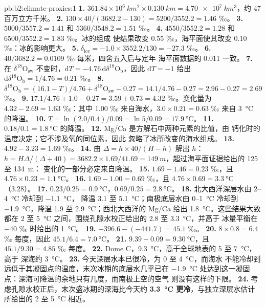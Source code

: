 \begin{solution}{pb:b2:climate-proxies:1}
\textbf{1.} $361.84 \times 10^6\ \unit{km^2} \times \qty{0.130}{km} = \qty{4.70e7}{km^3}$，约 47
百万立方千米。
\textbf{2.} $130 \times 40/(3682.2 - 130) = 5200/3552.2 = 1.46$ ‰。
\textbf{3.} $5000/3557.2 = 1.41$ 和 $5360/3548.2 = 1.51$ ‰。
\textbf{4.} $4550/3552.2 = 1.28$ 和 $6500/3552.2 = 1.83$ ‰。冰的组成
使结果改变 \num{0.55} ‰，海平面使其改变 \num{0.10} ‰：冰的影响更大。
\textbf{5.} $\delta_{\mathrm{ice}} = -1.0 \times 3552.2/130 = -27.3$ ‰。
\textbf{6.} $40/3682.2 = 0.0109$ ‰ 每米，四舍五入后与定年
海平面数据的 \num{0.011} 一致。
\textbf{7.} 在 $\delta^{18}\mathrm{O}_{\mathrm{sw}}$ 不变时，$\mathrm{d}T = -4.76\,\mathrm{d}\delta^{18}
\mathrm{O}_{\mathrm{b}}$，因此 $\mathrm{d}T = -1$ 给出 $\mathrm{d}\delta^{18}\mathrm{O}_{\mathrm{b}} =
1/4.76 = 0.21$ ‰。
\textbf{8.} $\delta^{18}\mathrm{O}_{\mathrm{b}} = (16.1 - T)/4.76 + \delta^{18}\mathrm{O}_{\mathrm{sw}}
- 0.27 = 14.1/4.76 - 0.27 = 2.96 - 0.27 = 2.69$ ‰。
\textbf{9.} $17.1/4.76 + 1.0 - 0.27 = 3.59 + 0.73 = 4.32$ ‰。变化量为 $4.32 - 2.69 =
1.63$ ‰：其中 \num{1.00} ‰ 来自海水，$3.0 \times 0.21 = 0.63$ ‰ 来自
\qty{3}{\celsius} 的降温。
\textbf{10.} $T = \ln(2.0/0.4)/0.09 = \ln 5/0.09 = \qty{17.9}{\celsius}$。
\textbf{11.} $0.18/0.1 = \qty{1.8}{\celsius}$ 的降温。
\textbf{12.} Mg/Ca 是方解石中两种元素的比值，由
钙化时的温度决定；它不涉及氧的同位素，因此
忽略了冰所改变的海水组成。
\textbf{13.} $4.92 - 3.23 = 1.69$ ‰。
\textbf{14.} 由 $\Delta = h \times 40/(H - h)$ 解出 $h$：$h = H\Delta/(\Delta + 40) = 3682.2
\times 1.69/41.69 = \qty{149}{m}$，超过海平面证据给出的 125 至 \qty{134}{m}：
变化的一部分必定来自降温。
\textbf{15.} $1.69 - 1.46 = 0.23$ ‰，且 $4.76 \times 0.23 = \qty{1.1}{\celsius}$。
\textbf{16.} $1.69 - 1.00 = 0.69$ ‰，且 $4.76 \times 0.69 = \qty{3.3}{\celsius}$（3.28）。
\textbf{17.} $0.23/0.25 = \qty{0.9}{\celsius}$，$0.69/0.25 = \qty{2.8}{\celsius}$。
\textbf{18.} 北大西洋深层水由 2--\qty{4}{\celsius} 冷却到 \qty{-1.1}{\celsius}，
降温 3.1 至 \qty{5.1}{\celsius}；南极底层水由 0--\qty{1}{\celsius} 冷却到
\qty{-1.9}{\celsius}，降温 1.9 至 \qty{2.9}{\celsius}；西北大西洋的 Mg/Ca 给出
\qty{1.8}{\celsius}。这些结果大致都在 2 至 \qty{5}{\celsius} 之间，围绕孔隙水校正给出的 2.8 至
\qty{3.3}{\celsius}，并高于
冰量平衡在 $-40$ ‰ 时给出的 \qty{1}{\celsius}。
\textbf{19.} $-396.6 - (-441.7) = 45.1$ ‰。
\textbf{20.} $8 \times 0.8 = 6.4$ ‰ 每度，因此 $45.1/6.4 = \qty{7.0}{\celsius}$。
\textbf{21.} $9.39 - 0.09 = \qty{9.30}{\celsius}$，且 $45.1/9.30 = 4.85$ ‰ 每度。
\textbf{22.} Dome C，\qty{9.3}{\celsius}，高于全球地表的 5 至 \qty{7}{\celsius}，高于
深海约 \qty{3}{\celsius}。
\textbf{23.} 今天深层水本已很冷，为 0 至 \qty{4}{\celsius}，而海水
不能冷却到远低于其凝固点的温度，末次冰期的底层水几乎已在
\qty{-1.9}{\celsius} 处达到这一凝固点：深海可降温的余地只有几度，而南极上空的空气
则没有这样的下限。
\textbf{24.} 考虑孔隙水校正后，末次盛冰期的深海比今天约 \textbf{\qty{3.3}{\celsius}
更冷}，与独立深层水估计所给出的
2 至 \qty{5}{\celsius} 相近。
\end{solution}
